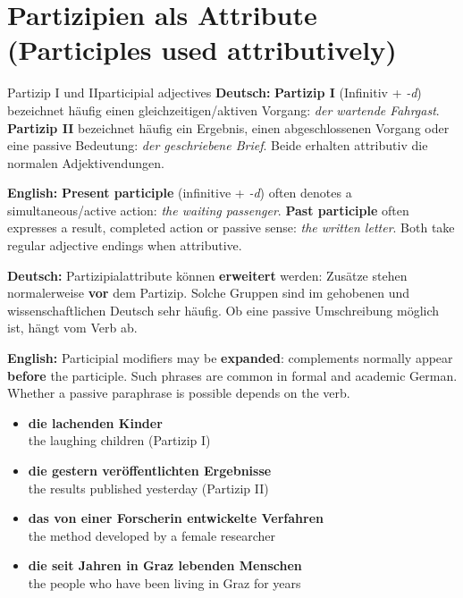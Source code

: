 \documentclass[a4paper,11pt]{article}
\newcommand{\GermanText}[1]{\textbf{Deutsch: }#1\par}
\newcommand{\EnglishText}[1]{{\small\color{SoftGray}\textbf{English: }#1\par}}
\newcommand{\ExampleItem}[2]{\item \textbf{#1}\\{\small\color{SoftGray}#2}}
\begin{document}
\section{Partizipien als Attribute \textnormal{(Participles used attributively)}}
\begin{grammarentry}{Partizip I und II}{participial adjectives}
\GermanText{\textbf{Partizip I} (Infinitiv + \emph{-d}) bezeichnet häufig einen gleichzeitigen/aktiven Vorgang: \emph{der wartende Fahrgast}. \textbf{Partizip II} bezeichnet häufig ein Ergebnis, einen abgeschlossenen Vorgang oder eine passive Bedeutung: \emph{der geschriebene Brief}. Beide erhalten attributiv die normalen Adjektivendungen.}
\EnglishText{\textbf{Present participle} (infinitive + \emph{-d}) often denotes a simultaneous/active action: \emph{the waiting passenger}. \textbf{Past participle} often expresses a result, completed action or passive sense: \emph{the written letter}. Both take regular adjective endings when attributive.}
\GermanText{Partizipialattribute können \textbf{erweitert} werden: Zusätze stehen normalerweise \textbf{vor} dem Partizip. Solche Gruppen sind im gehobenen und wissenschaftlichen Deutsch sehr häufig. Ob eine passive Umschreibung möglich ist, hängt vom Verb ab.}
\EnglishText{Participial modifiers may be \textbf{expanded}: complements normally appear \textbf{before} the participle. Such phrases are common in formal and academic German. Whether a passive paraphrase is possible depends on the verb.}
\end{grammarentry}
\begin{exbox}\begin{itemize}
\ExampleItem{die lachenden Kinder}{the laughing children (Partizip I)}
\ExampleItem{die gestern veröffentlichten Ergebnisse}{the results published yesterday (Partizip II)}
\ExampleItem{das von einer Forscherin entwickelte Verfahren}{the method developed by a female researcher}
\ExampleItem{die seit Jahren in Graz lebenden Menschen}{the people who have been living in Graz for years}
\end{itemize}\end{exbox}
\end{document}

